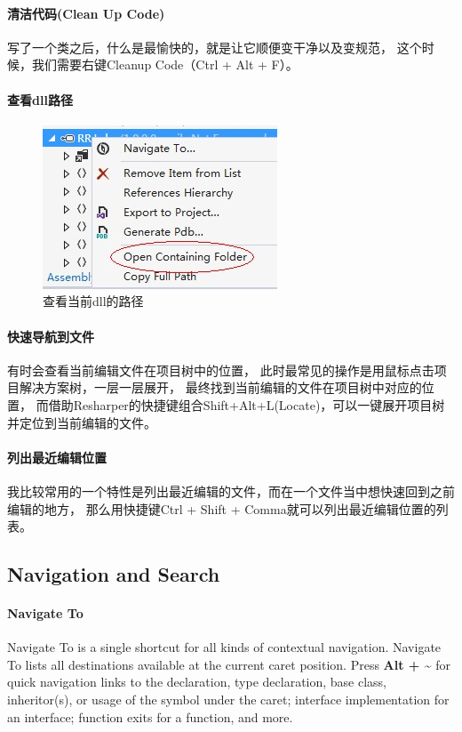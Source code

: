 \documentclass{book}
\begin{document}
\paragraph{清洁代码(Clean Up Code)}

写了一个类之后，什么是最愉快的，就是让它顺便变干净以及变规范，
这个时候，我们需要右键Cleanup Code（Ctrl + Alt + F）。

\paragraph{查看dll路径}

\begin{figure}[htbp]
	\centering
	\includegraphics[scale=0.6]{ExploreDllFullPath.jpg}
	\caption{查看当前dll的路径}
	\label{fig:ExploreDllFullPath}
\end{figure}

\paragraph{快速导航到文件}有时会查看当前编辑文件在项目树中的位置，
此时最常见的操作是用鼠标点击项目解决方案树，一层一层展开，
最终找到当前编辑的文件在项目树中对应的位置，
而借助Resharper的快捷键组合Shift+Alt+L(Locate)，可以一键展开项目树并定位到当前编辑的文件。

\paragraph{列出最近编辑位置}

我比较常用的一个特性是列出最近编辑的文件，而在一个文件当中想快速回到之前编辑的地方，
那么用快捷键Ctrl + Shift + Comma就可以列出最近编辑位置的列表。

\subsection{Navigation and Search}

\paragraph{Navigate To}Navigate To is a single shortcut for all kinds of contextual navigation. 
Navigate To lists all destinations available at the current caret position. 
Press \textbf{Alt + \~} for quick navigation links to the declaration, 
type declaration, base class, inheritor(s), or usage of the symbol under the caret; 
interface implementation for an interface; function exits for a function, and more.
\end{document}
